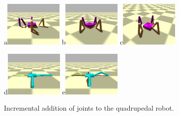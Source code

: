 \documentclass[12pt]{article}
\begin{document}
\begin{figure}[!t]
\centerline{
a\includegraphics[width=0.25\textwidth]{Fig1a}
b\includegraphics[width=0.25\textwidth]{Fig1b}
c\includegraphics[width=0.25\textwidth]{Fig1c}}
\centerline{
d\includegraphics[width=0.25\textwidth]{Fig1d}
e\includegraphics[width=0.25\textwidth]{Fig1e}}
\caption{Incremental addition of joints to the quadrupedal robot.}
\label{Fig1}
\end{figure}
\end{document}
